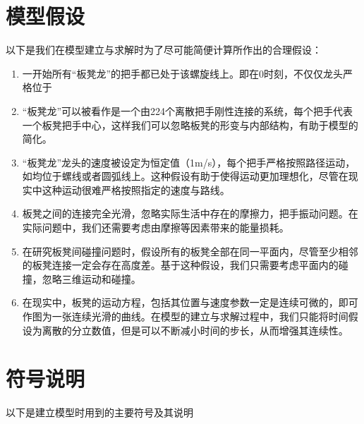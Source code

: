 \documentclass{cumcmthesis1}
\begin{document}
\section{模型假设}
\par
以下是我们在模型建立与求解时为了尽可能简便计算所作出的合理假设：
\begin{enumerate}
    \item 一开始所有“板凳龙”的把手都已处于该螺旋线上。即在0时刻，不仅仅龙头严格位于
    \item “板凳龙”可以被看作是一个由224个离散把手刚性连接的系统，每个把手代表一个板凳把手中心，这样我们可以忽略板凳的形变与内部结构，有助于模型的简化。
    \item “板凳龙”龙头的速度被设定为恒定值（1m/s），每个把手严格按照路径运动，如均位于螺线或者圆弧线上。这种假设有助于使得运动更加理想化，尽管在现实中这种运动很难严格按照指定的速度与路线。
    \item 板凳之间的连接完全光滑，忽略实际生活中存在的摩擦力，把手振动问题。在实际问题中，我们还需要考虑由摩擦等因素带来的能量损耗。
    \item 在研究板凳间碰撞问题时，假设所有的板凳全部在同一平面内，尽管至少相邻的板凳连接一定会存在高度差。基于这种假设，我们只需要考虑平面内的碰撞，忽略三维运动和碰撞。
    \item 在现实中，板凳的运动方程，包括其位置与速度参数一定是连续可微的，即可作图为一张连续光滑的曲线。在模型的建立与求解过程中，我们只能将时间假设为离散的分立数值，但是可以不断减小时间的步长，从而增强其连续性。
\end{enumerate}
\newpage
\section{符号说明}
\par 以下是建立模型时用到的主要符号及其说明
\end{document}
